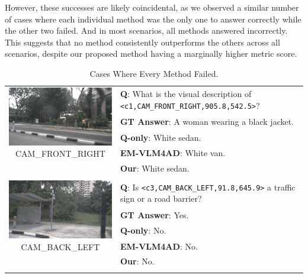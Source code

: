 \documentclass{article} %
\begin{document}
However, these successes are likely coincidental, as we observed a similar number of cases where each individual method was the only one to answer correctly while the other two failed. And in most scenarios, all methods answered incorrectly. This suggests that no method consistently outperforms the others across all scenarios, despite our proposed method having a marginally higher metric score.


\begin{table}[htbp]
    \centering
\begin{tabular}{cp{9cm}}
\multirow{4}{*}{\parbox{6cm}{
    \centering
    \includegraphics[width=6cm]{Figures/n015-2018-10-08-15-52-24+0800__CAM_FRONT_RIGHT__1538985706770339.jpg}\\
    {\tiny CAM\_FRONT\_RIGHT}
}}
& \textbf{Q}: What is the visual description of \texttt{<c1,CAM\_FRONT\_RIGHT,905.8,542.5>}? \\
& \textbf{GT Answer}: A woman wearing a black jacket. \\
& \textbf{Q-only}: White sedan. \\
& \textbf{EM-VLM4AD}: White van. \\ 
& \textbf{Our}: White sedan. \\
\vspace{2em} & \vspace{2em} \\

\multirow{4}{*}{\parbox{6cm}{
    \centering
    \includegraphics[width=6cm]{Figures/n015-2018-10-08-16-03-24+0800__CAM_BACK_LEFT__1538985816447423.jpg}\\
    {\tiny CAM\_BACK\_LEFT}
}}
& \textbf{Q}: Is \texttt{<c3,CAM\_BACK\_LEFT,91.8,645.9>} a traffic sign or a road barrier? \\
& \textbf{GT Answer}: Yes. \\
& \textbf{Q-only}: No. \\
& \textbf{EM-VLM4AD}: No. \\ 
& \textbf{Our}: No. \\
\vspace{2em} & \vspace{2em} \\
\end{tabular}
    \caption{Cases Where Every Method Failed.}
    \label{tab:qualitative_examples_all_fail}
\end{table}
\end{document}
